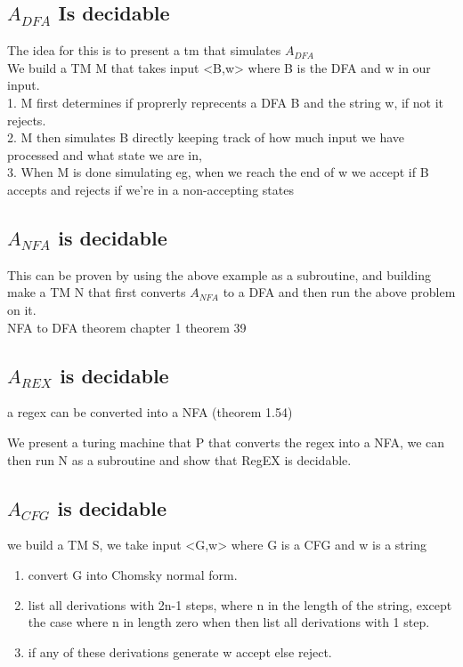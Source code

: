 \documentclass[a4paper,10pt,titlepage]{report}
\begin{document}
\subsection{$A_{DFA} $ Is decidable}
The idea for this is to present a tm that simulates $A_{DFA}$\\
We build a TM M that takes input <B,w> where B is the DFA and w in our input.\\
1. M first determines if proprerly reprecents a DFA B and the string w, if not it rejects. \\
2. M then simulates B directly keeping track of how much input we have processed and what state we are in, \\
3. When M is done simulating eg, when we reach the end of w we accept if B accepts and rejects if we're in a non-accepting states\\
\subsection{$A_{NFA}$ is decidable}

This can be proven by using the above example as a subroutine, and building make a TM N that first converts $A_{NFA}$ to  a DFA and then run the above problem on it.\\

NFA to DFA theorem chapter 1 theorem 39

\subsection{$A_{REX}$ is decidable}

a regex can be converted into a NFA (theorem 1.54)

We present a turing machine that P that converts the regex into a NFA, we can then run N as a subroutine and show that RegEX is decidable.

\subsection{$A_{CFG}$ is decidable}
we build a TM S, we take input <G,w> where G is a CFG and w is a string\\

\begin{enumerate}
\item convert G into Chomsky normal form.
\item list all derivations with 2n-1 steps,  where n in the length of the string, except the case where n in length zero when then list all derivations with 1 step.\
\item if any of these derivations generate w accept else reject.\\
\end{enumerate}
\end{document}
